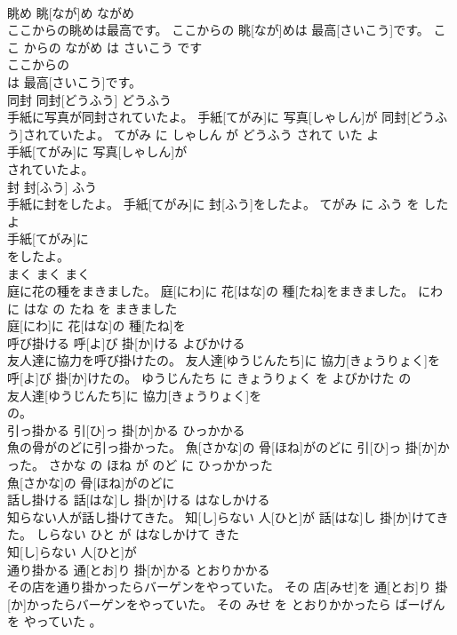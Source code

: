 \documentclass[8pt]{extreport}
\begin{document}
\begin{CJK}{UTF8}{min}
\\	眺め	眺[なが]め	ながめ	
\\	ここからの眺めは最高です。	ここからの 眺[なが]めは 最高[さいこう]です。	ここ からの ながめ は さいこう です	
\\	ここからの
\\	は 最高[さいこう]です。			
\\	同封	同封[どうふう]	どうふう	
\\	手紙に写真が同封されていたよ。	手紙[てがみ]に 写真[しゃしん]が 同封[どうふう]されていたよ。	てがみ に しゃしん が どうふう されて いた よ	
\\	手紙[てがみ]に 写真[しゃしん]が
\\	されていたよ。			
\\	封	封[ふう]	ふう	
\\	手紙に封をしたよ。	手紙[てがみ]に 封[ふう]をしたよ。	てがみ に ふう を した よ	
\\	手紙[てがみ]に
\\	をしたよ。			
\\	まく	まく	まく	
\\	庭に花の種をまきました。	庭[にわ]に 花[はな]の 種[たね]をまきました。	にわ に はな の たね を まきました	
\\	庭[にわ]に 花[はな]の 種[たね]を
\\	呼び掛ける	呼[よ]び 掛[か]ける	よびかける	
\\	友人達に協力を呼び掛けたの。	友人達[ゆうじんたち]に 協力[きょうりょく]を 呼[よ]び 掛[か]けたの。	ゆうじんたち に きょうりょく を よびかけた の	
\\	友人達[ゆうじんたち]に 協力[きょうりょく]を
\\	の。			
\\	引っ掛かる	引[ひ]っ 掛[か]かる	ひっかかる	
\\	魚の骨がのどに引っ掛かった。	魚[さかな]の 骨[ほね]がのどに 引[ひ]っ 掛[か]かった。	さかな の ほね が のど に ひっかかった	
\\	魚[さかな]の 骨[ほね]がのどに
\\	話し掛ける	話[はな]し 掛[か]ける	はなしかける	
\\	知らない人が話し掛けてきた。	知[し]らない 人[ひと]が 話[はな]し 掛[か]けてきた。	しらない ひと が はなしかけて きた	
\\	知[し]らない 人[ひと]が
\\	通り掛かる	通[とお]り 掛[か]かる	とおりかかる	
\\	その店を通り掛かったらバーゲンをやっていた。	その 店[みせ]を 通[とお]り 掛[か]かったらバーゲンをやっていた。	その みせ を とおりかかったら ばーげん を やっていた 。	

\end{CJK}
\end{document}
